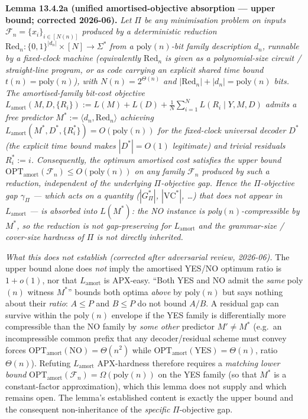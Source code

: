 \documentclass[
]{article}
\begin{document}
\begin{enumerate}
\textbf{Lemma 13.4.2a (unified amortised-objective absorption ---
upper bound; corrected 2026-06).}
\emph{Let $\Pi$ be any minimisation problem on inputs
$\mathcal{F}_n = \{x_i\}_{i \in [N(n)]}$ produced by a
deterministic reduction $\mathrm{Red}_n:
\{0,1\}^{|d_n|} \times [N] \to \Sigma^*$ from a
$\mathrm{poly}(n)$-bit family description $d_n$, runnable by a
\emph{fixed-clock} machine (equivalently $\mathrm{Red}_n$ is given
as a polynomial-size circuit / straight-line program, or as code
carrying an explicit shared time bound $t(n) = \mathrm{poly}(n)$),
with $N(n) = 2^{\Theta(n)}$ and $|\mathrm{Red}_n| + |d_n| =
\mathrm{poly}(n)$ bits. The amortised-family bit-cost objective
$L_{\mathrm{amort}}(M, D, \{R_i\}) := L(M) + L(D) +
\frac{1}{N}\sum_{i=1}^N L(R_i \mid Y, M, D)$
admits a free predictor $M^* := \langle d_n, \mathrm{Red}_n
\rangle$ achieving $L_{\mathrm{amort}}(M^*, D^*, \{R_i^*\}) =
O(\mathrm{poly}(n))$ for the fixed-clock universal decoder $D^*$
(the explicit time bound makes $|D^*| = O(1)$ legitimate) and
trivial residuals $R_i^* := i$. Consequently, the optimum
amortised cost satisfies the \emph{upper bound}
$\mathrm{OPT}_{\mathrm{amort}}(\mathcal{F}_n)
\leq O(\mathrm{poly}(n))$ on any family $\mathcal{F}_n$
produced by such a reduction, \emph{independent of} the
underlying $\Pi$-objective gap. Hence the $\Pi$-objective gap
$\gamma_\Pi$ --- which acts on a quantity ($|G^*_\Pi|$,
$|\mathrm{VC}^*|$, \dots) that does not appear in
$L_{\mathrm{amort}}$ --- is \emph{absorbed into $L(M^*)$}: the NO
instance is poly$(n)$-compressible by $M^*$, so the reduction is
not gap-preserving for $L_{\mathrm{amort}}$ and the grammar-size /
cover-size hardness of $\Pi$ is not directly inherited.}

\emph{What this does \emph{not} establish (corrected after adversarial review, 2026-06).} The upper bound alone does
\emph{not} imply the amortised YES/NO optimum ratio is $1 + o(1)$,
nor that $L_{\mathrm{amort}}$ is APX-easy. ``Both YES and NO admit
the \emph{same} poly$(n)$ witness $M^*$'' bounds both optima
\emph{above} by $\mathrm{poly}(n)$ but says nothing about their
\emph{ratio}: $A \leq P$ and $B \leq P$ do not bound $A/B$. A
residual gap can survive within the poly$(n)$ envelope if the YES
family is differentially more compressible than the NO family by
\emph{some other} predictor $M' \neq M^*$ (e.g.\ an incompressible
common prefix that any decoder/residual scheme must convey forces
$\mathrm{OPT}_{\mathrm{amort}}(\text{NO}) = \Theta(n^2)$ while
$\mathrm{OPT}_{\mathrm{amort}}(\text{YES}) = \Theta(n)$, ratio
$\Theta(n)$). Refuting $L_{\mathrm{amort}}$ APX-hardness therefore
requires a \emph{matching lower bound} $\mathrm{OPT}_{\mathrm{amort}}
(\mathcal{F}_n) = \Omega(\mathrm{poly}(n))$ on the YES family
(so that $M^*$ is a constant-factor approximation), which this
lemma does not supply and which remains open. The lemma's
established content is exactly the upper bound and the consequent
non-inheritance of the \emph{specific} $\Pi$-objective gap.


\end{enumerate}
\end{document}
